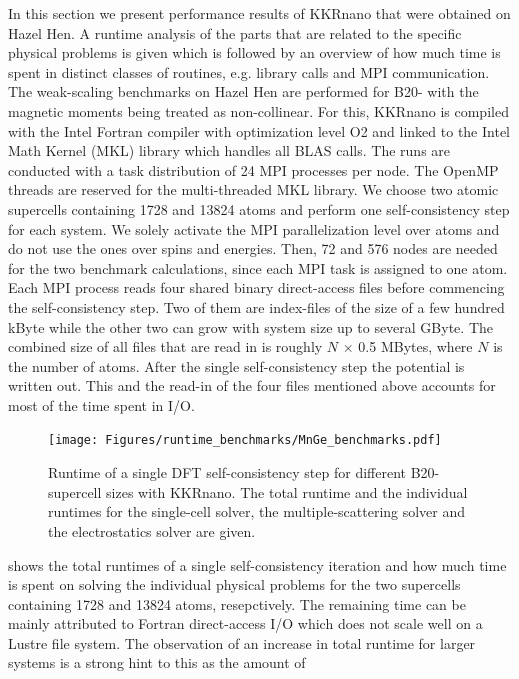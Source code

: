 \documentclass[graybox]{svmult}
\begin{document}
In this section we present performance results of KKRnano that were obtained on Hazel Hen.
A runtime analysis of the parts that are related to the specific physical problems is given
which is followed by an overview of how much time is spent in distinct
classes of routines, e.g. library calls and MPI communication.
The weak-scaling benchmarks on Hazel Hen are performed for B20- 
with the magnetic moments being treated as
non-collinear.
For this, KKRnano is compiled with the Intel Fortran compiler
with optimization level O2 and linked to the Intel Math Kernel (MKL) library which handles all BLAS calls.
The runs are conducted with a task distribution of 24 MPI processes per node. The OpenMP threads 
are reserved for the multi-threaded MKL library.
We choose two atomic supercells containing 1728 and 13824 atoms 
and perform one self-consistency step for each system.
We solely activate the MPI parallelization level over atoms and do not use the ones over spins and energies.
Then, 72 and 576  nodes
are needed for the two benchmark calculations, since each MPI task is assigned to one atom. 
Each MPI process reads four shared binary direct-access
files before commencing the self-consistency step.
Two of them are index-files of the size of a few hundred kByte while the other two can grow with system size
up to several GByte. The combined size of all files that are 
read in is roughly $N$ $\times$ 0.5 MBytes, where $N$ is the number of atoms. 
After the single self-consistency step 
the potential is written out. 
This and the read-in of the four files mentioned above accounts for most of the time spent in I/O.
\begin{figure}[htb]
\begin{center}
 \texttt{[image: Figures/runtime\_benchmarks/MnGe\_benchmarks.pdf]}
\end{center}
	\caption{Runtime of a single DFT self-consistency step
	for different B20- supercell sizes with KKRnano. 
	The total runtime and the individual runtimes for the single-cell solver,
	the multiple-scattering solver and the electrostatics solver are given.
	}
\label{fig:MnGe_6x6x6_benchmark}
\end{figure}
shows the total runtimes of a single self-consistency iteration and how much time is spent
on solving the individual physical problems for the two supercells containing 1728 and 13824 atoms, resepctively.
The remaining time
can be mainly attributed to Fortran direct-access I/O which does not scale well on a Lustre file system.
The observation of an increase in total runtime for larger systems is a strong hint to this as the amount of
\end{document}
